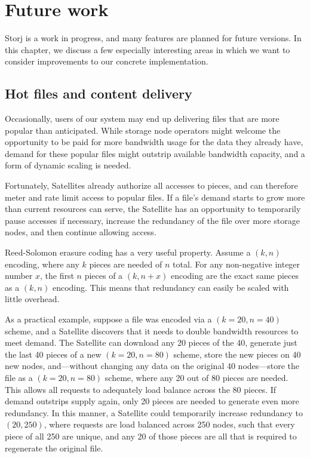 \documentclass[8pt,fleqn,openany]{book}
\begin{document}
\chapter{Future work}\label{chap:future-work}

Storj is a work in progress, and many features are planned for future
versions. In this chapter, we discuss a few especially interesting areas in
which we want to consider improvements to our concrete implementation.

\section{Hot files and content delivery}\label{sec:future-hot-files}

Occasionally, users of our system may end up delivering files that are more
popular than anticipated. While storage node operators might welcome the
opportunity to be paid for more bandwidth usage for the data they already have,
demand for these popular files might outstrip available bandwidth capacity,
and a form of dynamic scaling is needed.

Fortunately, Satellites already authorize all accesses to pieces, and
can therefore meter and rate limit access to popular
files. If a file's demand starts to grow more than current resources can serve,
the Satellite has an opportunity to temporarily pause accesses if necessary,
increase the redundancy of the file over more storage nodes, and then continue
allowing access.

Reed-Solomon erasure coding has a very useful property. Assume a $(k, n)$
encoding, where any $k$ pieces are needed of $n$ total. For any non-negative
integer number $x$, the first $n$ pieces of a $(k, n+x)$ encoding are the exact
same pieces as a $(k, n)$ encoding. This means that redundancy can easily be
scaled with little overhead.

As a practical example, suppose a file was encoded via a $(k=20, n=40)$ scheme,
and a Satellite discovers that it needs to double bandwidth resources to meet demand.
The Satellite can download any 20 pieces of the 40, generate just the last 40
pieces of a new $(k=20, n=80)$ scheme, store the new pieces on 40 new nodes,
and---without changing any data on the original 40 nodes---store the file
as a $(k=20, n=80)$ scheme, where any 20 out of 80 pieces are needed.
This allows all requests to adequately load balance across the 80 pieces.
If demand outstrips supply again, only 20 pieces are needed to generate even
more redundancy. In this manner, a Satellite could temporarily increase
redundancy to $(20, 250)$, where requests are load balanced across 250 nodes,
such that every piece of all 250 are unique, and any 20 of those pieces are
all that is required to regenerate the original file.
\end{document}
